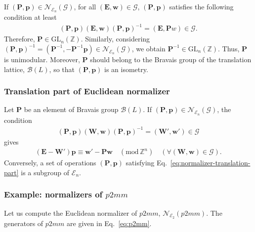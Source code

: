 If $(\bm{P}, \bm{p} ) \in \mathcal{N}_{\mathcal{E}_{n}}(\mathcal{G})$, for all $(\bm{E}, \bm{w}) \in \mathcal{G}$, $(\bm{P}, \bm{p})$ satisfies the following condition at least
\begin{align}
  (\bm{P}, \bm{p}) (\bm{E}, \bm{w}) (\bm{P}, \bm{p})^{-1} = (\bm{E}, \bm{P}{w}) \in \mathcal{G}.
\end{align}
Therefore, $\bm{P} \in \mathrm{GL}_{n}(\mathbb{Z})$.
Similarly, considering $(\bm{P}, \bm{p} )^{-1} = (\bm{P}^{-1}, -\bm{P}^{-1}\bm{p} ) \in \mathcal{N}_{\mathcal{E}_{n}}(\mathcal{G})$, we obtain $\bm{P}^{-1} \in \mathrm{GL}_{n}(\mathbb{Z})$.
Thus, $\bm{P}$ is unimodular.
Moreover, $\bm{P}$ should belong to the Bravais group of the translation lattice, $\mathcal{B}(L)$, so that $(\bm{P}, \bm{p} )$ is an isometry.

\subsubsection{Translation part of Euclidean normalizer}

Let $\bm{P}$ be an element of Bravais group $\mathcal{B}(L)$.
If $(\bm{P}, \bm{p} ) \in \mathcal{N}_{\mathcal{E}_{n}}(\mathcal{G})$, the condition
\begin{align}
  (\bm{P}, \bm{p}) (\bm{W}, \bm{w}) (\bm{P}, \bm{p})^{-1} = (\bm{W}', \bm{w}') \in \mathcal{G}
\end{align}
gives
\begin{align}
    \label{eq:normalizer-translation-part}
    (\bm{E} - \bm{W}' ) \bm{p} \equiv \bm{w}' - \bm{Pw} \quad (\mathrm{mod}\, \mathbb{Z}^{n})
    \quad (\forall ( \bm{W}, \bm{w} ) \in \mathcal{G} ).
\end{align}
Conversely, a set of operations $(\bm{P}, \bm{p})$ satisfying Eq.~\eqref{eq:normalizer-translation-part} is a subgroup of $\mathcal{E}_{n}$.

\subsubsection{\label{sec:normalizer-example-p2mm}Example: normalizers of \texorpdfstring{$p2mm$}{p2mm}}

Let us compute the Euclidean normalizer of $p2mm$, $\mathcal{N}_{\mathcal{E}_{2}}(p2mm)$.
The generators of $p2mm$ are given in Eq.~\eqref{eq:p2mm}.

